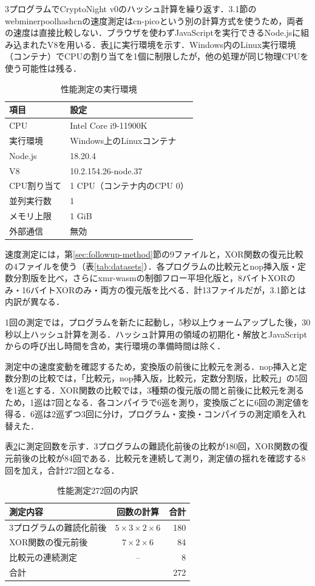\documentclass[submit,techrep]{ipsj}
\begin{document}
3プログラムでCryptoNight v0のハッシュ計算を繰り返す．3.1節のwebminerpoolhashcnの速度測定はcn-picoという別の計算方式を使うため，両者の速度は直接比較しない．ブラウザを使わずJavaScriptを実行できるNode.jsに組み込まれたV8を用いる．表\ref{tab:runtime-environment}に実行環境を示す．Windows内のLinux実行環境（コンテナ）でCPUの割り当てを1個に制限したが，他の処理が同じ物理CPUを使う可能性は残る．
\begin{table}[t]
\centering\small
\caption{性能測定の実行環境}
\label{tab:runtime-environment}
\begin{tabular}{lp{}}
\hline
項目 & 設定 \\
\hline
CPU & Intel Core i9-11900K \\
実行環境 & Windows上のLinuxコンテナ \\
Node.js & 18.20.4 \\
V8 & 10.2.154.26-node.37 \\
CPU割り当て & 1 CPU（コンテナ内のCPU 0） \\
並列実行数 & 1 \\
メモリ上限 & 1 GiB \\
外部通信 & 無効 \\
\hline
\end{tabular}
\end{table}

速度測定には，第\ref{sec:followup-method}節の9ファイルと，XOR関数の復元比較の4ファイルを使う（表\ref{tab:datasets}）．各プログラムの比較元とnop挿入版・定数分割版を比べ，さらにxmr-wasmの制御フロー平坦化版と，8バイトXORのみ・16バイトXORのみ・両方の復元版を比べる．計13ファイルだが，3.1節とは内訳が異なる．

1回の測定では，プログラムを新たに起動し，5秒以上ウォームアップした後，30秒以上ハッシュ計算を測る．ハッシュ計算用の領域の初期化・解放とJavaScriptからの呼び出し時間を含め，実行環境の準備時間は除く．

測定中の速度変動を確認するため，変換版の前後に比較元を測る．nop挿入と定数分割の比較では，「比較元，nop挿入版，比較元，定数分割版，比較元」の5回を1巡とする．XOR関数の比較では，3種類の復元版の間と前後に比較元を測るため，1巡は7回となる．各コンパイラで6巡を測り，変換版ごとに6回の測定値を得る．6巡は2巡ずつ3回に分け，プログラム・変換・コンパイラの測定順を入れ替えた．

表\ref{tab:measurement-counts}に測定回数を示す．3プログラムの難読化前後の比較が180回，XOR関数の復元前後の比較が84回である．比較元を連続して測り，測定値の揺れを確認する8回を加え，合計272回となる．
\begin{table}[t]
\centering\small
\caption{性能測定272回の内訳}
\label{tab:measurement-counts}
\setlength{\tabcolsep}{3pt}
\begin{tabular}{>{\raggedright\arraybackslash}p{}cr}
\hline
測定内容 & 回数の計算 & 合計 \\
\hline
3プログラムの難読化前後 & $5\times3\times2\times6$ & 180 \\
XOR関数の復元前後 & $7\times2\times6$ & 84 \\
比較元の連続測定 & -- & 8 \\
\hline
合計 & & 272 \\
\hline
\end{tabular}
\end{table}
\end{document}
